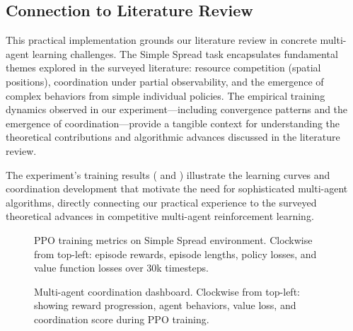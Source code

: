 \subsection{Connection to Literature Review}

This practical implementation grounds our literature review in concrete multi-agent learning challenges. The Simple Spread task encapsulates fundamental themes explored in the surveyed literature: resource competition (spatial positions), coordination under partial observability, and the emergence of complex behaviors from simple individual policies. The empirical training dynamics observed in our experiment—including convergence patterns and the emergence of coordination—provide a tangible context for understanding the theoretical contributions and algorithmic advances discussed in the literature review.

The experiment's training results ( and ) illustrate the learning curves and coordination development that motivate the need for sophisticated multi-agent algorithms, directly connecting our practical experience to the surveyed theoretical advances in competitive multi-agent reinforcement learning.

\begin{figure}[h]
    \centering
    
    \caption{PPO training metrics on Simple Spread environment. Clockwise from top-left: episode rewards, episode lengths, policy losses, and value function losses over 30k timesteps.}
    \label{fig:training_history}
\end{figure}

\begin{figure}[h]
    \centering
    
    \caption{Multi-agent coordination dashboard. Clockwise from top-left: showing reward progression, agent behaviors, value loss, and coordination score during PPO training.}
    \label{fig:training_dashboard}
\end{figure}